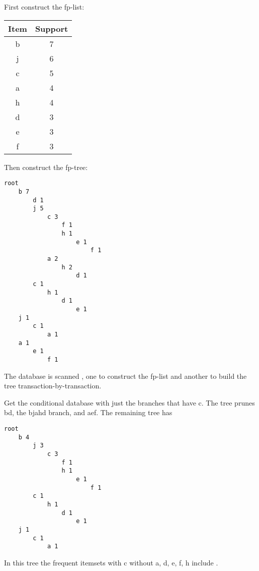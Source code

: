 \documentclass[newpage]{homework}
\begin{document}
\begin{alphaparts}

\questionpart    
First construct the fp-list:

\begin{tabular}[h]{|c|c|}
        \hline
        Item & Support  \\
        \hline
        b & 7   \\
        j & 6   \\
        c & 5   \\
        a & 4   \\
        h & 4   \\
        d & 3   \\
        e & 3   \\
        f & 3   \\
        \hline
\end{tabular}

Then construct the fp-tree:
\begin{verbatim}
root
    b 7
        d 1
        j 5
            c 3
                f 1
                h 1
                    e 1
                        f 1
            a 2
                h 2
                    d 1
        c 1
            h 1
                d 1
                    e 1
    j 1
        c 1
            a 1
    a 1
        e 1
            f 1
\end{verbatim}

\questionpart
The database is scanned , one to construct the fp-list and another to build the tree transaction-by-transaction.

\newpage
\questionpart
Get the conditional database with just the branches that have c. The tree prunes bd, the bjahd branch, and aef. The remaining tree has
\begin{verbatim}
root
    b 4
        j 3
            c 3
                f 1
                h 1
                    e 1
                        f 1
        c 1
            h 1
                d 1
                    e 1
    j 1
        c 1
            a 1
\end{verbatim}
In this tree the frequent itemsets with c without a, d, e, f, h include .

\end{alphaparts}
\end{document}
